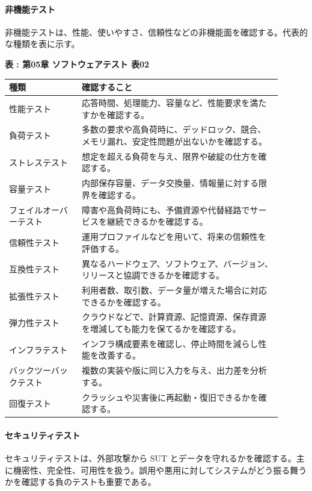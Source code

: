 \paragraph{非機能テスト}
非機能テストは、性能、使いやすさ、信頼性などの非機能面を確認する。代表的な種類を表に示す。

\par\smallskip\noindent{}\label{tab:ch05-02}\textbf{表 \thetable: 第05章 ソフトウェアテスト 表02}\par\smallskip
\begin{longtable}{P{0.24\linewidth}P{0.66\linewidth}}
\toprule
\textbf{種類} & \textbf{確認すること} \\
\midrule
性能テスト & 応答時間、処理能力、容量など、性能要求を満たすかを確認する。\\
負荷テスト & 多数の要求や高負荷時に、デッドロック、競合、メモリ漏れ、安定性問題が出ないかを確認する。\\
ストレステスト & 想定を超える負荷を与え、限界や破綻の仕方を確認する。\\
容量テスト & 内部保存容量、データ交換量、情報量に対する限界を確認する。\\
フェイルオーバーテスト & 障害や高負荷時にも、予備資源や代替経路でサービスを継続できるかを確認する。\\
信頼性テスト & 運用プロファイルなどを用いて、将来の信頼性を評価する。\\
互換性テスト & 異なるハードウェア、ソフトウェア、バージョン、リリースと協調できるかを確認する。\\
拡張性テスト & 利用者数、取引数、データ量が増えた場合に対応できるかを確認する。\\
弾力性テスト & クラウドなどで、計算資源、記憶資源、保存資源を増減しても能力を保てるかを確認する。\\
インフラテスト & インフラ構成要素を確認し、停止時間を減らし性能を改善する。\\
バックツーバックテスト & 複数の実装や版に同じ入力を与え、出力差を分析する。\\
回復テスト & クラッシュや災害後に再起動・復旧できるかを確認する。\\
\bottomrule
\end{longtable}

\paragraph{セキュリティテスト}
セキュリティテストは、外部攻撃から SUT とデータを守れるかを確認する。主に機密性、完全性、可用性を扱う。誤用や悪用に対してシステムがどう振る舞うかを確認する負のテストも重要である。

